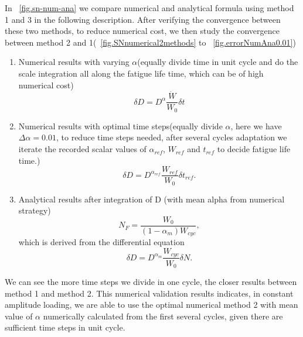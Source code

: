 \documentclass[3p,times,number,review]{elsarticle}
\newcommand{\figref}[1]{\figurename~\ref{#1}}
\begin{document}
\newpage
In \figref{fig.sn-num-ana} we compare numerical and analytical formula using method 1 and 3 in the following description. After verifying the convergence between these two methods, to reduce numerical cost, we then study the convergence between method 2 and 1(\figref{fig.SNnumerical2methods} to \figref{fig.errorNumAna0.01})
\begin{enumerate}
	\item  Numerical results with varying $\alpha$(equally divide time in unit cycle and do the scale integration all along the fatigue life time, which can be of high numerical cost)$$\delta D=D^\alpha\frac{\dot{W}}{W_0}\delta t$$
	\vspace{6pt}
	
	\item  Numerical results with optimal time steps(equally divide $\alpha$, here we have $\Delta\alpha=0.01$, to reduce time steps needed, after several cycles adaptation we iterate the recorded scalar values of $\alpha_{ref}$, $W_{ref}$ and $t_{ref}$ to decide fatigue life time.)
	$$\delta D=D^{\alpha_{ref}}\frac{W_{ref}}{W_0}\delta t_{ref}.$$
	\vspace{6pt}
	
	\item  Analytical results after integration of D (with mean alpha from numerical strategy)$$N_F=\frac{W_0}{( 1-\alpha_m)W_{cyc}},$$ 
	which is derived from the differential equation
	$$\delta D=D^{\alpha_m}\frac{W_{cyc}}{W_0}\delta N.$$
\end{enumerate}	
We can see the more time steps we divide in one cycle, the closer results between method 1 and method 2. This numerical validation results indicates, in constant amplitude loading, we are able to use the optimal numerical method 2 with mean value of $\alpha$ numerically calculated from the first several cycles, given there are sufficient time steps in unit cycle. 
\end{document}
